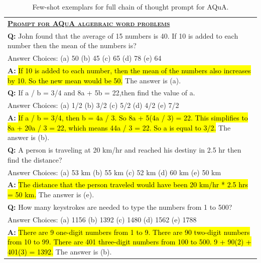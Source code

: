 \begingroup
\begin{table}[H]
    \centering
    \small
    \caption{
    Few-shot exemplars for full chain of thought prompt for AQuA.
    }
    \begin{tabular}{p{\linewidth}}
        \toprule
        \underline{\textbf{\textsc{Prompt for AQuA algebraic word problems}}} \\
        \vspace{-2mm}
        \textbf{Q:} John found that the average of 15 numbers is 40. If 10 is added to each number then the mean of the numbers is? \\ Answer Choices: (a) 50 (b) 45 (c) 65 (d) 78 (e) 64 \\
        \vspace{-1mm}
        \textbf{A:} \hl{If 10 is added to each number, then the mean of the numbers also increases by 10. So the new mean would be 50.} The answer is (a). \\
         \vspace{0mm}
        \textbf{Q:} If a / b = 3/4 and 8a + 5b = 22,then find the value of a. \\ Answer Choices: (a) 1/2 (b) 3/2 (c) 5/2 (d) 4/2 (e) 7/2 \\
        \vspace{-1mm}
        \textbf{A:} \hl{If a / b = 3/4, then b = 4a / 3. So 8a + 5(4a / 3) = 22. This simplifies to 8a + 20a / 3 = 22, which means 44a / 3 = 22. So a is equal to 3/2.} The answer is (b). \\
        \vspace{0mm}
        \textbf{Q:} A person is traveling at 20 km/hr and reached his destiny in 2.5 hr then find the distance? \\ Answer Choices: (a) 53 km (b) 55 km (c) 52 km (d) 60 km (e) 50 km \\
        \vspace{-1mm}
        \textbf{A:} \hl{The distance that the person traveled would have been 20 km/hr * 2.5 hrs = 50 km.}  The answer is (e). \\
        \vspace{0mm}
        \textbf{Q:} How many keystrokes are needed to type the numbers from 1 to 500? \\ Answer Choices: (a) 1156 (b) 1392 (c) 1480 (d) 1562 (e) 1788 \\
        \vspace{-1mm}
        \textbf{A:} \hl{There are 9 one-digit numbers from 1 to 9. There are 90 two-digit numbers from 10 to 99. There are 401 three-digit numbers from 100 to 500. 9 + 90(2) + 401(3) = 1392.} The answer is (b). \\
        \bottomrule
    \end{tabular}
    \label{tab:appendix-aqua-prompt}
\end{table}
\endgroup